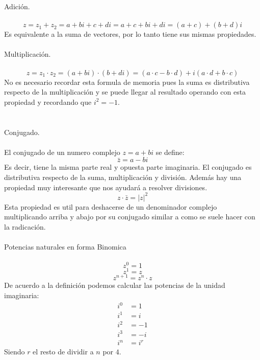 \documentclass[]{article}
\begin{document}
\Large Adición.
\normalsize
\\
\\
$$
z = z_1 +z_2 = a+bi + c+di = a+c+bi+di = (a+c) + (b+d) i
$$
Es equivalente a la suma de vectores, por lo tanto tiene sus mismas propiedades.
\\
\\
\Large Multiplicación.
\normalsize
\\
\\
$$
z = z_1 \cdot z_2 = (a+bi)\cdot(b+di) = (a\cdot c - b\cdot d) + i(a\cdot d + b \cdot c) 
$$
No es necesario recordar esta formula de memoria pues la suma es distributiva respecto de la multiplicación y se puede llegar al resultado operando con esta propiedad y recordando que $i^{2} = -1$.
\\
\\\\
\Large Conjugado.
\normalsize
\\
\\
El conjugado de un numero complejo $z=a+bi$ se define:
$$
\bar{z} = a - bi
$$
Es decir, tiene la misma parte real y opuesta parte imaginaria. El conjugado es distributiva respecto de la suma, multiplicación y división. Además hay una propiedad muy interesante que nos ayudará a resolver divisiones.
$$
z \cdot \bar{z} = |z|^{2}
$$
Esta propiedad es util para deshacerse de un denominador complejo multiplicando arriba y abajo por su conjugado similar a como se suele hacer con la radicación.
\\
\\
\Large Potencias naturales en forma Binomica
\normalsize
\\
\\
$$
z^{0} = 1
$$
$$
z^{1} = z
$$
$$
z^{n+1} = z^{n}\cdot z
$$
De acuerdo a la definición podemos calcular las potencias de la unidad imaginaria:
\begin{align}
  i^{0} &= 1 \\
  i^{1} &= i \\
  i^{2} &= -1 \\
  i^{3} &= -i \\
  i^{n} &= i^{r}
\end{align}
Siendo $r$ el resto de dividir a $n$ por $4$.
\\
\end{document}
